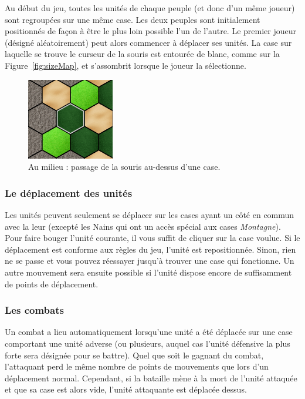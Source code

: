 Au début du jeu, toutes les unités de chaque peuple (et donc d'un même joueur) sont regroupées sur une même case. Les deux peuples sont initialement positionnés de façon à être le plus loin possible l'un de l'autre. Le premier joueur (désigné aléatoirement) peut alors commencer à déplacer ses unités. La case sur laquelle se trouve le curseur de la souris est entourée de blanc, comme sur la {\sc Figure}~\ref{fig:sizeMap}, et s'assombrit lorsque le joueur la sélectionne.

\begin{figure}[!h]
    \centering
    \includegraphics[height=0.40\textwidth]{figure/selectSpace.png}
    \caption{Au milieu : passage de la souris au-dessus d'une case.}
    \label{fig:onSpace}
\end{figure}

\subsubsection{Le déplacement des unités}

Les unités peuvent seulement se déplacer sur les cases ayant un côté en commun avec la leur (excepté les Nains qui ont un accès spécial aux cases \textit{Montagne}). Pour faire bouger l'unité courante, il vous suffit de cliquer sur la case voulue. Si le déplacement est conforme aux règles du jeu, l'unité est repositionnée. Sinon, rien ne se passe et vous pouvez réessayer jusqu'à trouver une case qui fonctionne. Un autre mouvement sera ensuite possible si l'unité dispose encore de suffisamment de points de déplacement.

\subsubsection{Les combats}

Un combat a lieu automatiquement lorsqu'une unité a été déplacée sur une case comportant une unité adverse (ou plusieurs, auquel cas l'unité défensive la plus forte sera désignée pour se battre). Quel que soit le gagnant du combat, l'attaquant perd le même nombre de points de mouvements que lors d'un déplacement normal. Cependant, si la bataille mène à la mort de l'unité attaquée et que sa case est alors vide, l'unité attaquante est déplacée dessus.

